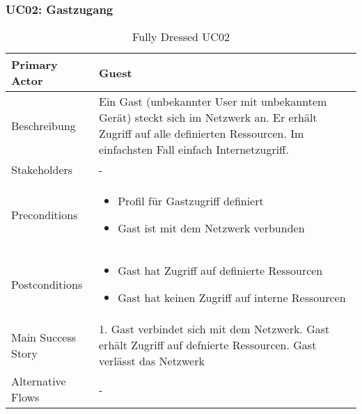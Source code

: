\subsubsection{UC02: Gastzugang}
\begin{table}[H]
	\centering
	\begin{tabularx}{\textwidth}{l | X}
		Primary Actor   & Guest        \\
		\hline
		Beschreibung   & Ein Gast (unbekannter User mit unbekanntem Gerät) steckt sich im Netzwerk an. Er erhält Zugriff auf alle definierten Ressourcen. Im einfachsten Fall einfach Internetzugriff.  \\ 
		\hline
		Stakeholders       & - \\ 
		Preconditions      &
		\begin{itemize}	
			\item Profil für Gastzugriff definiert
			\item Gast ist mit dem Netzwerk verbunden
		\end{itemize}  \\
		\hline
		Postconditions     & 
		\begin{itemize}	
			\item Gast hat Zugriff auf definierte Ressourcen
			\item Gast hat keinen Zugriff auf interne Ressourcen
		\end{itemize}  \\
		\hline
		Main Success Story & 
		1.  Gast verbindet sich mit dem Netzwerk\newline
		2.  Gast erhält Zugriff auf defnierte Ressourcen\newline
		3.  Gast verlässt das Netzwerk\newline
		\\
		\hline
		Alternative Flows  & -
	\end{tabularx}
	\caption{Fully Dressed UC02}
	\label{tab:UC02}
\end{table}

